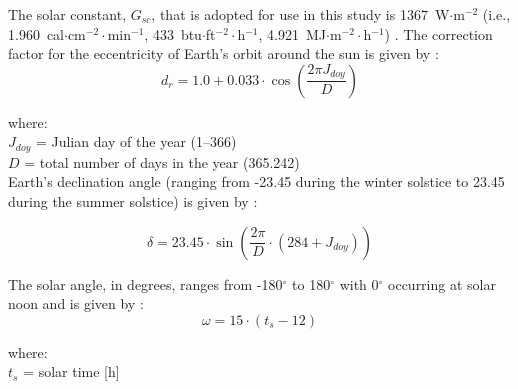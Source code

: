 \noindent The solar constant, $G_{sc}$, that is adopted for use in this study is 1367~W$\cdot$m$^{-2}$ (i.e., 1.960~cal$\cdot$cm$^{-2}\cdot$min$^{-1}$, 433~btu$\cdot$ft$^{-2}\cdot$h$^{-1}$, 4.921~MJ$\cdot$m$^{-2}\cdot$h$^{-1}$) \parencite{duffie13,wehrli85}.  
The correction factor for the eccentricity of Earth's orbit around the sun is given by \parencite{spencer71}:
%
\begin{equation}
\label{eq:dr}
    d_{r} = 1.0 + 0.033 \cdot \cos \left(\frac{2\pi J_{doy}}{D}\right)
\end{equation}

\noindent where: \\
\indent $J_{doy}$ = Julian day of the year (1--366) \\
\indent $D$ = total number of days in the year (365.242) \\

\noindent Earth's declination angle (ranging from -23.45 during the winter solstice to 23.45 during the summer solstice) is given by \parencite{cooper69}:

\begin{equation}
\label{eq:delta}
    \delta = 23.45 \cdot \sin \left(\frac{2\pi}{D}\cdot (284 + J_{doy})\right)
\end{equation}

\noindent The solar angle, in degrees, ranges from -180$^{\circ}$ to 180$^{\circ}$ with 0$^{\circ}$ occurring at solar noon and is given by \parencite[Eq. 3.1]{stine01}:
\begin{equation}
\label{eq:omega}
    \omega = 15 \cdot (t_{s} - 12)
\end{equation}

\noindent where: \\
\indent $t_{s}$ = solar time [h] \\


